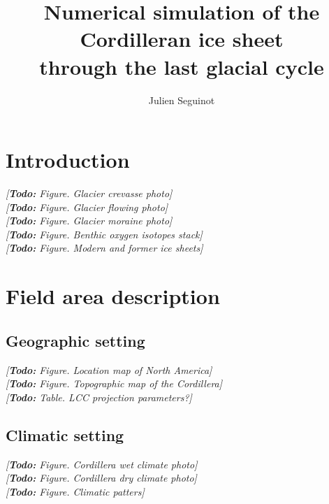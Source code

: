 \documentclass{article}
\title{Numerical simulation of the Cordilleran ice sheet \\
       through the last glacial cycle}
\author{Julien Seguinot}
\newcommand{\todo}[1]{\emph{[\textbf{Todo:} #1]}}
\begin{document}

\maketitle
\linenumbers
\tableofcontents

\section{Introduction}

\todo{Figure. Glacier crevasse photo}\\
\todo{Figure. Glacier flowing photo}\\
\todo{Figure. Glacier moraine photo}\\
\todo{Figure. Benthic oxygen isotopes stack}\\
\todo{Figure. Modern and former ice sheets}

\section{Field area description}

\subsection{Geographic setting}

\todo{Figure. Location map of North America}\\
\todo{Figure. Topographic map of the Cordillera}\\
\todo{Table. LCC projection parameters?}

\subsection{Climatic setting}

\todo{Figure. Cordillera wet climate photo}\\
\todo{Figure. Cordillera dry climate photo}\\
\todo{Figure. Climatic patters}
\end{document}
